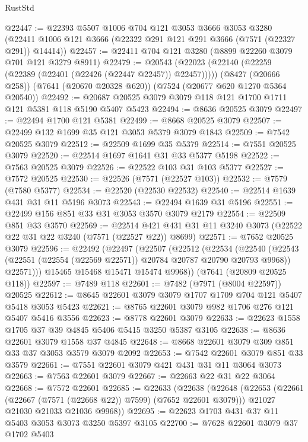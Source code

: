 \begin{lexlean}{RustStd}
\begin{coremodule}
@22447 := @22393
    @5507
    @1006
    @704
    @121
    @3053
    @3666
    @3053
    @3280
    (@22411 @1006 @121 @3666 (@22322 @291 @121 @291 @3666 (@7571 (@22327 @291)) @14414))
@22457 := @22411 @704 @121 @3280 (@8899 @22260 @3079 @701 @121 @3279 @8911)
@22479 := @20543
    (@22023 (@22140 (@22259 (@22389 (@22401 (@22426 (@22447 @22457)) @22457)))))
    (@8427 (@20666 @258))
    (@7641 (@20670 @20328 @620))
    (@7524 (@20677 @620 @1270 @5364 @20540))
@22492 := @20687 @20525 @3079 @3079 @118 @121 @1700 @1711 @121 @5381 @118 @5190 @5407 @5423
@22494 := @8636 @20525 @3079
@22497 := @22494 @1700 @121 @5381
@22499 := @8668 @20525 @3079
@22507 := @22499 @132 @1699 @35 @121 @3053 @5379 @3079 @1843
@22509 := @7542 @20525 @3079
@22512 := @22509 @1699 @35 @5379
@22514 := @7551 @20525 @3079
@22520 := @22514 @1697 @1641 @31 @33 @5377 @5198
@22522 := @7563 @20525 @3079
@22526 := @22522 @103 @31 @103 @5377
@22527 := @7572 @20525
@22530 := @22526 (@7571 (@22527 @103))
@22532 := @7579 (@7580 @5377)
@22534 := @22520 (@22530 @22532)
@22540 := @22514 @1639 @431 @31 @11 @5196 @3073
@22543 := @22494 @1639 @31 @5196
@22551 := @22499 @156 @851 @33 @31 @3053 @3570 @3079 @2179
@22554 := @22509 @851 @33 @3570
@22569 := @22514 @421 @431 @31 @11 @3240 @3073 (@22522 @22 @31 @22 @3240 (@7571 (@22527 @22)) @8699)
@22571 := @7652 @20525 @3079
@22596 := @22492
    (@22497
      (@22507
        (@22512
          (@22534
            (@22540
              (@22543 (@22551 (@22554 (@22569 @22571)) @20784 @20787 @20790 @20793 @9968))
              @22571)))
        @15465
        @15468
        @15471
        @15474
        @9968))
    (@7641 (@20809 @20525 @118))
@22597 := @7489 @118
@22601 := @7482 (@7971 (@8004 @22597)) @20525
@22612 := @8645 @22601 @3079 @3079 @1707 @1709 @704 @121 @5407 @5418 @3053 @5423
@22621 := @8765 @22601 @3079 @982 @1706 @276 @121 @5407 @5416 @3556
@22623 := @8778 @22601 @3079
@22633 := @22623 @1558 @1705 @37 @39 @4845 @5406 @5415 @3250 @5387 @3105
@22638 := @8636 @22601 @3079 @1558 @37 @4845
@22648 := @8668 @22601 @3079 @309 @851 @33 @37 @3053 @3579 @3079 @2092
@22653 := @7542 @22601 @3079 @851 @33 @3579
@22661 := @7551 @22601 @3079 @421 @431 @31 @11 @3064 @3073
@22663 := @7563 @22601 @3079
@22667 := @22663 @22 @31 @22 @3064
@22668 := @7572 @22601
@22685 := @22633
    (@22638
      (@22648
        (@22653 (@22661 (@22667 (@7571 (@22668 @22)) @7599) (@7652 @22601 @3079)))
        @21027
        @21030
        @21033
        @21036
        @9968))
@22695 := @22623 @1703 @431 @37 @11 @5403 @3053 @3073 @3250 @5397 @3105
@22700 := @7628 @22601 @3079 @37 @1702 @5403

\end{coremodule}
\end{lexlean}
